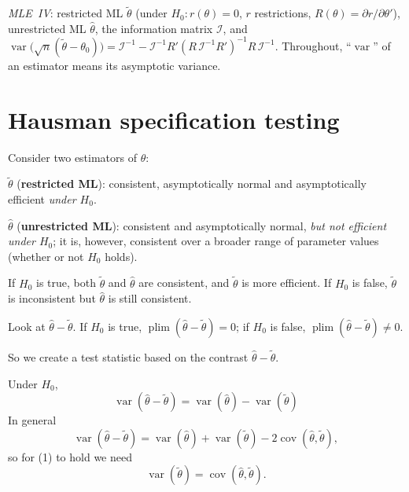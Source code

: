 \documentclass[11pt]{article}
\begin{document}

 \emph{MLE~IV}: restricted ML $\tilde\theta$ (under $H_{0}\colon r(\theta)=0$, $r$
restrictions, $R(\theta)=\partial r/\partial\theta'$), unrestricted ML $\hat\theta$, the information matrix
$\mathcal I$, and
$\operatorname{var}\bigl(\sqrt n(\tilde\theta-\theta_{0})\bigr)=\mathcal I^{-1}-\mathcal I^{-1}R'(R\,\mathcal I^{-1}R')^{-1}R\,\mathcal I^{-1}$.
Throughout, ``$\operatorname{var}$'' of an estimator means its asymptotic variance.

\section{Hausman specification testing}

Consider two estimators of $\theta$:
\begin{flatlist}
 \item $\tilde\theta$ (\textbf{restricted ML}): consistent, asymptotically normal and asymptotically
       efficient \emph{under $H_{0}$}.
 \item $\hat\theta$ (\textbf{unrestricted ML}): consistent and asymptotically normal, \emph{but not
       efficient under $H_{0}$}; it is, however, consistent over a broader range of parameter values
       (whether or not $H_{0}$ holds).
\end{flatlist}

\begin{flatnum}
 \item If $H_{0}$ is true, both $\tilde\theta$ and $\hat\theta$ are consistent, and $\tilde\theta$ is more
       efficient. If $H_{0}$ is false, $\tilde\theta$ is inconsistent but $\hat\theta$ is still consistent.
 \item Look at $\hat\theta-\tilde\theta$. If $H_{0}$ is true, $\operatorname{plim}(\hat\theta-\tilde\theta)=0$; if $H_{0}$
       is false, $\operatorname{plim}(\hat\theta-\tilde\theta)\neq0$.
\end{flatnum}
So we create a test statistic based on the contrast $\hat\theta-\tilde\theta$.

Under $H_{0}$,
\begin{equation}\tag{1}
 \boxed{\ \operatorname{var}(\hat\theta-\tilde\theta)=\operatorname{var}(\hat\theta)-\operatorname{var}(\tilde\theta)\ }
\end{equation}
In general
\[ \operatorname{var}(\hat\theta-\tilde\theta)=\operatorname{var}(\hat\theta)+\operatorname{var}(\tilde\theta)-2\operatorname{cov}(\hat\theta,\tilde\theta), \]
so for (1) to hold we need
\begin{equation}\tag{2}
 \operatorname{var}(\tilde\theta)=\operatorname{cov}(\hat\theta,\tilde\theta).
\end{equation}
\end{document}
